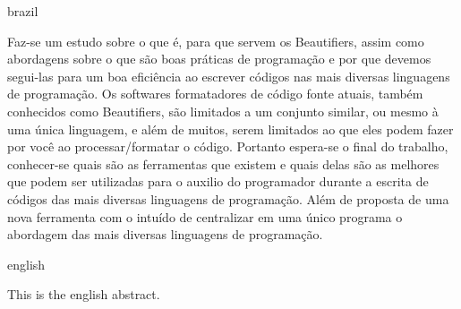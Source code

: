 %
\begin{otherlanguage*}{brazil}
\begin{resumo}

    Faz-se um estudo sobre o que é, para que servem os Beautifiers, assim como abordagens sobre o
    que são boas práticas de programação e por que devemos segui-las para um boa eficiência ao
    escrever códigos nas mais diversas linguagens de programação. Os softwares formatadores de
    código fonte atuais, também conhecidos como Beautifiers, são limitados a um conjunto similar, ou
    mesmo à uma única linguagem, e além de muitos, serem limitados ao que eles podem fazer por você
    ao processar/formatar o código.
    Portanto espera-se o final do trabalho, conhecer-se quais são as ferramentas que existem e quais
    delas são as melhores que podem ser utilizadas para o auxilio do programador durante a escrita
    de códigos das mais diversas linguagens de programação. Além de proposta de uma nova ferramenta
    com o intuído de centralizar em uma único programa o abordagem das mais diversas linguagens de
    programação.


\end{resumo}
\end{otherlanguage*}


\begin{otherlanguage*}{english}
\begin{resumo}[Abstract]

    This is the english abstract.


\end{resumo}
\end{otherlanguage*}


